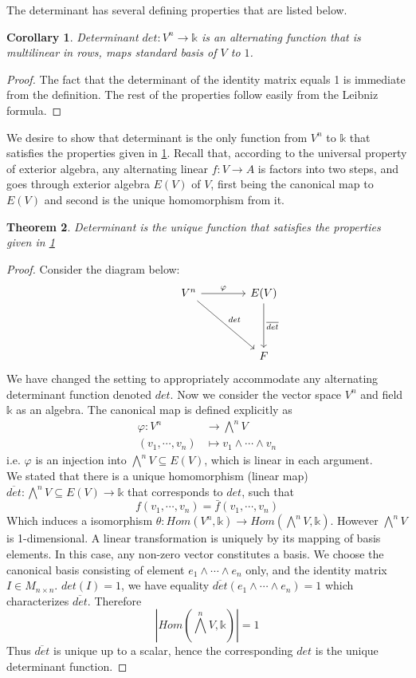 \documentclass[12pt]{article}
\newtheorem{theorem}{Theorem}
\newtheorem{corollary}[theorem]{Corollary}
\numberwithin{theorem}{section}
\numberwithin{equation}{theorem}
\newcommand{\kk}{\mathds{k}}
\begin{document}
The determinant has several defining properties that are listed below.
\begin{corollary}\label{cor:detprop}
    Determinant $det : V^n \to \kk$ is an alternating function that is multilinear in rows, maps standard basis of $V$ to $1$.
\end{corollary}
\begin{proof}
    The fact that the determinant of the identity matrix equals 1 is immediate from the definition. The rest of the properties follow easily from the Leibniz formula. 
\end{proof}

We desire to show that determinant is the only function from $V^n$ to $\kk$ that satisfies the properties given in \ref{cor:detprop}. Recall that, according to the universal property of exterior algebra, any alternating linear $f: V \to A$ is factors into two steps, and goes through exterior algebra $E(V)$ of $V$, first being the canonical map to $E(V)$ and second is the unique homomorphism from it.

\begin{theorem}\label{detunique}
    Determinant is the unique function that satisfies the properties given in \ref{cor:detprop}
\end{theorem}
\begin{proof}
    Consider the diagram below:
    $$
    \begin{tikzcd}[row sep = 4em, column sep = 4em]
    & V^n \arrow{r}{\varphi} \arrow{dr}{det} & E(V) \arrow{d}{\overline{det}} \\ & & F
    \end{tikzcd}
    $$
    We have changed the setting to appropriately accommodate any alternating determinant function denoted $det$. Now we consider the vector space $V^n$ and field $\kk$ as an algebra. The canonical map is defined explicitly as
    \begin{align*}
        \varphi : V^n &\to \bigwedge^n V\\
        (v_1, \cdots, v_n) &\mapsto v_1 \wedge \cdots \wedge v_n
    \end{align*} i.e. $\varphi$ is an injection into $\bigwedge^nV \subseteq E(V)$, which is linear in each argument. \\
    We stated that there is a unique homomorphism (linear map) $\overline{det} :  \bigwedge^n V \subseteq E(V) \to \kk$ that corresponds to $det$, such that $$f(v_1, \cdots, v_n) = \bar{f}(v_1, \cdots, v_n)$$ Which induces a isomorphism $\theta : Hom(V^n, \kk) \to Hom(\bigwedge^nV, \kk)$. However $\bigwedge^nV$ is 1-dimensional. A linear transformation is uniquely by its mapping of basis elements. In this case, any non-zero vector constitutes a basis. We choose the canonical basis consisting of element $e_1 \wedge \cdots \wedge e_n$ only, and the identity matrix $I \in M_{n \times n}$. $det(I) = 1$, we have equality $\overline{det}(e_1 \wedge \cdots \wedge e_n) = 1$ which characterizes $\overline{det}$. Therefore $$\left|Hom(\bigwedge^nV, \kk)\right| = 1$$ Thus $\overline{det}$ is unique up to a scalar, hence the corresponding $det$ is the unique determinant function.
\end{proof}
\end{document}
